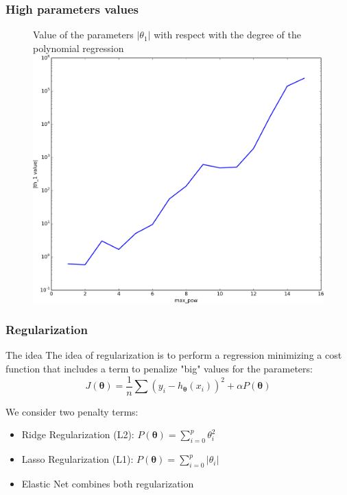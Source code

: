 \documentclass[handout, 10pt]{beamer}
\begin{document}
\begin{frame}
\frametitle{High parameters values}
\begin{figure}
Value of the parameters $|\theta_1|$ with respect with the degree of the polynomial
regression\\
\includegraphics[height=0.75\textheight]{./coefs_th1.png}
\end{figure}

\end{frame}

\begin{frame}
\frametitle{Regularization}
\begin{block}{The idea}
The idea of regularization is to perform a regression minimizing a cost function
that includes a term to penalize "big" values for the parameters:
$$
J(\bm{\theta}) = \frac{1}{n} \sum (y_i - h_{\bm{\theta}}(x_i))^2 + \alpha P(\bm{\theta})
$$
\end{block}
\pause
We consider two penalty terms:
\begin{itemize}[<+->]
\item \alert{Ridge Regularization (L2):} $P(\bm{\theta}) = \sum_{i=0}^p \theta_i^2$
\item \alert{Lasso Regularization (L1):} $P(\bm{\theta}) = \sum_{i=0}^p |\theta_i|$
\item Elastic Net combines both regularization
\end{itemize}

\end{frame}
\end{document}
